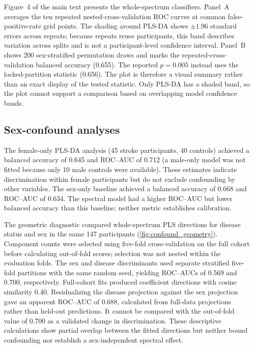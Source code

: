 \documentclass[preprint,12pt]{elsarticle}
\begin{document}
Figure~4 of the main text presents the whole-spectrum classifiers. Panel~A averages the ten repeated nested-cross-validation ROC curves at common false-positive-rate grid points. The shading around PLS-DA shows $\pm1.96$ standard errors across repeats; because repeats reuse participants, this band describes variation across splits and is not a participant-level confidence interval. Panel~B shows 200 sex-stratified permutation draws and marks the repeated-cross-validation balanced accuracy (0.655). The reported $p=0.005$ instead uses the locked-partition statistic (0.656). The plot is therefore a visual summary rather than an exact display of the tested statistic. Only PLS-DA has a shaded band, so the plot cannot support a comparison based on overlapping model confidence bands.


\subsection{Sex-confound analyses}

The female-only PLS-DA analysis (45 stroke participants, 40 controls) achieved a balanced accuracy of 0.645 and ROC--AUC of 0.712 (a male-only model was not fitted because only 10 male controls were available). These estimates indicate discrimination within female participants but do not exclude confounding by other variables. The sex-only baseline achieved a balanced accuracy of 0.668 and ROC--AUC of 0.634. The spectral model had a higher ROC--AUC but lower balanced accuracy than this baseline; neither metric establishes calibration.

The geometric diagnostic compared whole-spectrum PLS directions for disease status and sex in the same 147 participants (\cref{fig:confound_geometry}). Component counts were selected using five-fold cross-validation on the full cohort before calculating out-of-fold scores; selection was not nested within the evaluation folds. The sex and disease discriminants used separate stratified five-fold partitions with the same random seed, yielding ROC--AUCs of 0.569 and 0.700, respectively. Full-cohort fits produced coefficient directions with cosine similarity 0.40. Residualizing the disease projection against the sex projection gave an apparent ROC--AUC of 0.688, calculated from full-data projections rather than held-out predictions. It cannot be compared with the out-of-fold value of 0.700 as a validated change in discrimination. These descriptive calculations show partial overlap between the fitted directions but neither bound confounding nor establish a sex-independent spectral effect.
\end{document}
